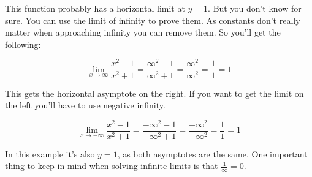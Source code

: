 \begin{figure}[h]
  \begin{center}
  \end{center}
\end{figure}

This function probably has a horizontal limit at \(y=1\).
But you don't know for sure.
You can use the limit of infinity to prove them.
As constants don't really matter when approaching infinity you can remove them.
So you'll get the following:

\[
  \lim_{x \to \infty} \frac{x^2-1}{x^2+1} =
  \frac{\infty^2-1}{\infty^2+1} =
  \frac{\infty^2}{\infty^2} =
  \frac{1}{1} =
  1
\]

This gets the horizontal asymptote on the right.
If you want to get the limit on the left you'll have to use negative infinity.

\[
  \lim_{x \to -\infty} \frac{x^2-1}{x^2+1} =
  \frac{-\infty^2-1}{-\infty^2+1} =
  \frac{-\infty^2}{-\infty^2} =
  \frac{1}{1} =
  1
\]

In this example it's also \(y=1\), as both asymptotes are the same.
One important thing to keep in mind when solving infinite limits is that \(\frac{1}{\infty} = 0\).
